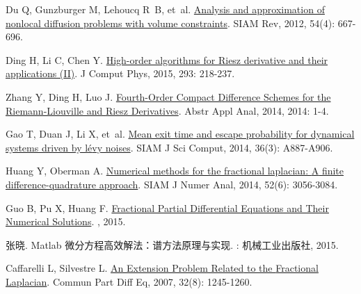 \begin{thebibliography}{79}
    Du Q, Gunzburger M, Lehoucq R~B, et~al.
    \newblock \href{https://doi.org/10.1137/110833294}{Analysis and approximation of nonlocal diffusion problems with volume constraints}\allowbreak[J].
    \newblock SIAM Rev, 2012, 54\allowbreak (4): 667-696.
    
    Ding H, Li C, Chen Y.
    \newblock \href{https://www.sciencedirect.com/science/article/pii/S0021999114004148}{High-order algorithms for {{Riesz}} derivative and their applications ({{II}})}\allowbreak[J].
    \newblock J Comput Phys, 2015, 293: 218-237.
    
    Zhang Y, Ding H, Luo J.
    \newblock \href{http://www.hindawi.com/journals/aaa/2014/540692/}{Fourth-{{Order Compact Difference Schemes}} for the {{Riemann-Liouville}} and {{Riesz Derivatives}}}\allowbreak[J].
    \newblock Abstr Appl Anal, 2014, 2014: 1-4.
    
    Gao T, Duan J, Li X, et~al.
    \newblock \href{https://doi.org/10.1137/120897262}{Mean exit time and escape probability for dynamical systems driven by l{\'e}vy noises}\allowbreak[J].
    \newblock SIAM J Sci Comput, 2014, 36\allowbreak (3): A887-A906.
    
    Huang Y, Oberman A.
    \newblock \href{https://doi.org/10.1137/140954040}{Numerical methods for the fractional laplacian: {{A}} finite difference-quadrature approach}\allowbreak[J].
    \newblock SIAM J Numer Anal, 2014, 52\allowbreak (6): 3056-3084.
    
    Guo B, Pu X, Huang F.
    \newblock \href{https://www.worldscientific.com/worldscibooks/10.1142/9543}{{Fractional Partial Differential Equations and Their Numerical Solutions}}\allowbreak[M].
    , 2015.
    
    {张晓}.
    \newblock Matlab 微分方程高效解法：谱方法原理与实现\allowbreak[M].
    : {机械工业出版社}, 2015.
    
    Caffarelli L, Silvestre L.
    \newblock \href{http://www.tandfonline.com/doi/abs/10.1080/03605300600987306}{An {{Extension Problem Related}} to the {{Fractional Laplacian}}}\allowbreak[J].
    \newblock Commun Part Diff Eq, 2007, 32\allowbreak (8): 1245-1260.
    

\end{thebibliography}
